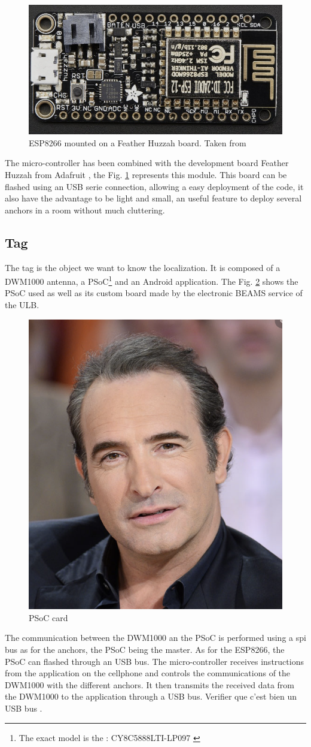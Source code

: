 \begin{figure}[H]
	\centering
	\includegraphics[width=.6\linewidth]{Images/esp8266.png}
	\caption{ESP8266 mounted on a Feather Huzzah board. Taken from \cite{adafruit}}
	\label{fig:esp8266}
\end{figure}

The micro-controller has been combined with the development board Feather Huzzah from Adafruit \cite{adafruit}, the Fig. \ref{fig:esp8266} represents this module. This board can be flashed using an USB serie connection, allowing a easy deployment of the code, it also have the advantage to be light and small, an useful feature to deploy several anchors in a room without much cluttering.

\subsection{Tag}

The tag is the object we want to know the localization. It is composed of a DWM1000 antenna, a PSoC\footnote{The exact model is the : CY8C5888LTI-LP097 \cite{guyard2019navigation}} and an Android application. The Fig. \ref{fig:psoc} shows the PSoC used as well as its custom board made by the electronic BEAMS service of the ULB.
\vspace{2mm}

\begin{figure}[H]
	\centering
	\includegraphics[width=.2\linewidth]{Images/Temporary_pic.png}
	\caption{PSoC card}
	\label{fig:psoc}
\end{figure}

The communication between the DWM1000 an the PSoC is performed using a \gls{spi} bus as for the anchors, the PSoC being the master. As for the ESP8266, the PSoC can flashed through an USB bus. The micro-controller receives instructions from the application on the cellphone and controls the communications of the DWM1000 with the different anchors. It then transmits the received data from the DWM1000 to the application through a USB bus. \color{red} Verifier que c'est bien un USB bus \color{black}.

